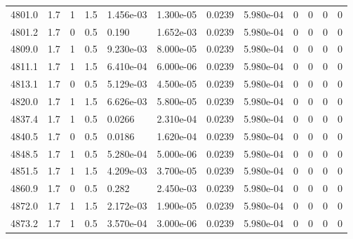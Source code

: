 \documentclass[preview]{standalone}
\begin{document}
{{{{{{{{{{{{{{{{{{{\begin{tabular}{L{1.2cm}C{1.2cm} C{0.3cm}C{0.5cm} C{1.4cm}C{1.4cm} C{1.4cm}C{1.4cm} C{1.6cm}C{1.6cm} C{1.6cm}C{1.6cm}}
  4801.0  &   1.7  & 1     & 1.5 &  1.456e-03  & 1.300e-05  &  0.0239&   5.980e-04& 0 & 0   &  0 & 0  \\ 
  4801.2  &   1.7  & 0     & 0.5 &  0.190  & 1.652e-03  &  0.0239&   5.980e-04& 0 & 0   &  0 & 0  \\ 
  4809.0  &   1.7  & 1     & 0.5 &  9.230e-03  & 8.000e-05  &  0.0239&   5.980e-04& 0 & 0   &  0 & 0  \\ 
  4811.1  &   1.7  & 1     & 1.5 &  6.410e-04  & 6.000e-06  &  0.0239&   5.980e-04& 0 & 0   &  0 & 0  \\ 
  4813.1  &   1.7  & 0     & 0.5 &  5.129e-03  & 4.500e-05  &  0.0239&   5.980e-04& 0 & 0   &  0 & 0  \\ 
  4820.0  &   1.7  & 1     & 1.5 &  6.626e-03  & 5.800e-05  &  0.0239&   5.980e-04& 0 & 0   &  0 & 0  \\ 
  4837.4  &   1.7  & 1     & 0.5 &  0.0266  & 2.310e-04  &  0.0239&   5.980e-04& 0 & 0   &  0 & 0  \\ 
  4840.5  &   1.7  & 0     & 0.5 &  0.0186  & 1.620e-04  &  0.0239&   5.980e-04& 0 & 0   &  0 & 0  \\ 
  4848.5  &   1.7  & 1     & 0.5 &  5.280e-04  & 5.000e-06  &  0.0239&   5.980e-04& 0 & 0   &  0 & 0  \\ 
  4851.5  &   1.7  & 1     & 1.5 &  4.209e-03  & 3.700e-05  &  0.0239&   5.980e-04& 0 & 0   &  0 & 0  \\ 
  4860.9  &   1.7  & 0     & 0.5 &  0.282  & 2.450e-03  &  0.0239&   5.980e-04& 0 & 0   &  0 & 0  \\ 
  4872.0  &   1.7  & 1     & 1.5 &  2.172e-03  & 1.900e-05  &  0.0239&   5.980e-04& 0 & 0   &  0 & 0  \\ 
  4873.2  &   1.7  & 1     & 0.5 &  3.570e-04  & 3.000e-06  &  0.0239&   5.980e-04& 0 & 0   &  0 & 0  \\ 
\hline 
\end{tabular} 

}}}}}}}}}}}}}}}}}}}
\end{document}
